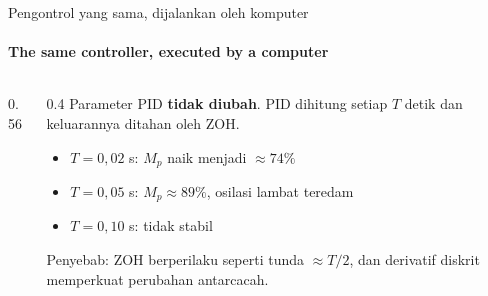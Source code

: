 \documentclass[aspectratio=169,10pt]{beamer}
\begin{document}
\begin{frame}{Pengontrol yang sama, dijalankan oleh komputer}
	\framesubtitle{The same controller, executed by a computer}
	\begin{columns}[c]
		\begin{column}{0.56\textwidth}
			\centering
		\end{column}
		\begin{column}{0.4\textwidth}
			\small
			Parameter PID \textbf{tidak diubah}. PID dihitung setiap $T$ detik dan keluarannya ditahan oleh ZOH.

			\vspace{0.2cm}
			\begin{itemize}
				\item $T=0{,}02$ s: $M_p$ naik menjadi $\approx 74\%$
				\item $T=0{,}05$ s: $M_p \approx 89\%$, osilasi lambat teredam
				\item $T=0{,}10$ s: \alert{tidak stabil}
			\end{itemize}
			\vspace{0.1cm}
			{\scriptsize Penyebab: ZOH berperilaku seperti tunda $\approx T/2$, dan derivatif diskrit memperkuat perubahan antarcacah.}
		\end{column}
	\end{columns}
\end{frame}
\end{document}
